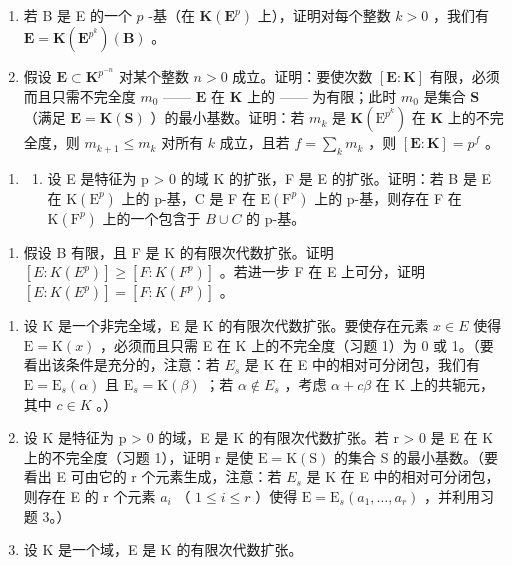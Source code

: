 \begin{enumerate}
\def\labelenumi{\alph{enumi})}
\item
  若 B 是 E 的一个 \(p\) -基（在 \(\mathbf{K}(\mathbf{E}^p)\) 上），证明对每个整数 \(k > 0\) ，我们有 \(\mathbf{E} = \mathbf{K}(\mathbf{E}^{p^k})(\mathbf{B})\) 。
\item
  假设 \(\mathbf{E} \subset \mathbf{K}^{p^{-n}}\) 对某个整数 \(n > 0\) 成立。证明：要使次数 \([\mathbf{E}:\mathbf{K}]\) 有限，必须而且只需不完全度 \(m_0\) —— \(\mathbf{E}\) 在 \(\mathbf{K}\) 上的 —— 为有限；此时 \(m_0\) 是集合 \(\mathbf{S}\) （满足 \(\mathbf{E} = \mathbf{K}(\mathbf{S})\) ）的最小基数。证明：若 \(m_k\) 是 \(\mathbf{K}(\mathrm{E}^{p^k})\) 在 \(\mathbf{K}\) 上的不完全度，则 \(m_{k + 1} \leqslant m_k\) 对所有 \(k\) 成立，且若 \(f = \sum_{k} m_k\) ，则 \([\mathbf{E}:\mathbf{K}] = p^f\) 。
\end{enumerate}

\begin{enumerate}
\def\labelenumi{\arabic{enumi})}
\setcounter{enumi}{1}
\tightlist
\item
  \begin{enumerate}
  \def\labelenumii{\alph{enumii})}
  \tightlist
  \item
    设 E 是特征为 p \textgreater{} 0 的域 K 的扩张，F 是 E 的扩张。证明：若 B 是 E 在 \(\mathrm{K}(\mathrm{E}^{p})\) 上的 p-基，C 是 F 在 \(\mathrm{E}(\mathrm{F}^{p})\) 上的 p-基，则存在 F 在 \(\mathrm{K}(\mathrm{F}^{p})\) 上的一个包含于 \(B \cup C\) 的 p-基。
  \end{enumerate}
\end{enumerate}

\begin{enumerate}
\def\labelenumi{\alph{enumi})}
\setcounter{enumi}{1}
\tightlist
\item
  假设 B 有限，且 F 是 K 的有限次代数扩张。证明 \([E:K(E^{p})]\geqslant[F:K(F^{p})]\) 。若进一步 F 在 E 上可分，证明 \([E:K(E^{p})]=[F:K(F^{p})]\) 。
\end{enumerate}

\begin{enumerate}
\def\labelenumi{\arabic{enumi})}
\setcounter{enumi}{2}
\item
  设 K 是一个非完全域，E 是 K 的有限次代数扩张。要使存在元素 \(x \in E\) 使得 \(\mathrm{E} = \mathrm{K}(x)\) ，必须而且只需 E 在 K 上的不完全度（习题 1）为 0 或 1。（要看出该条件是充分的，注意：若 \(E_{s}\) 是 K 在 E 中的相对可分闭包，我们有 \(\mathrm{E} = \mathrm{E}_{s}(\alpha)\) 且 \(\mathrm{E}_{s} = \mathrm{K}(\beta)\) ；若 \(\alpha \notin E_{s}\) ，考虑 \(\alpha + c\beta\) 在 K 上的共轭元，其中 \(c \in K\) 。）
\item
  设 K 是特征为 p \textgreater{} 0 的域，E 是 K 的有限次代数扩张。若 r \textgreater{} 0 是 E 在 K 上的不完全度（习题 1），证明 r 是使 \(\mathrm{E} = \mathrm{K}(\mathrm{S})\) 的集合 S 的最小基数。（要看出 E 可由它的 r 个元素生成，注意：若 \(E_{s}\) 是 K 在 E 中的相对可分闭包，则存在 E 的 r 个元素 \(a_{i}\) （ \(1 \leqslant i \leqslant r\) ）使得 \(\mathrm{E} = \mathrm{E}_{s}(a_{1}, \ldots, a_{r})\) ，并利用习题 3。）
\item
  设 K 是一个域，E 是 K 的有限次代数扩张。
\end{enumerate}

